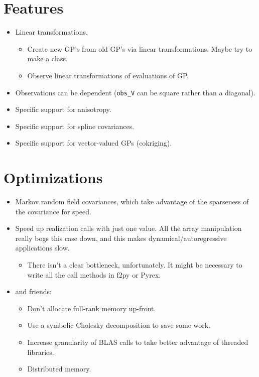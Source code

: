 \documentclass{manual}
\begin{document}
\section{Features}
\begin{itemize}
    \item Linear transformations.
    \begin{itemize}
        \item Create new GP's from old GP's via linear transformations. Maybe try to make a  class.
        \item Observe linear transformations of evaluations of GP.
    \end{itemize}
    \item Observations can be dependent (\texttt{obs_V} can be square rather than a diagonal).
    \item Specific support for anisotropy.
    \item Specific support for spline covariances.
    \item Specific support for vector-valued GPs (cokriging).
\end{itemize}

\section{Optimizations}
\begin{itemize}
    \item Markov random field covariances, which take advantage of the sparseness of the covariance for speed.
    \item Speed up realization calls with just one value. All the array manipulation really bogs this case down, and this makes dynamical/autoregressive applications slow.
    \begin{itemize}
        \item There isn't a clear bottleneck, unfortunately. It might be necessary to write all the call methods in f2py or Pyrex.
    \end{itemize}
\item {} and friends:
\begin{itemize}
    \item Don't allocate full-rank memory up-front.
    \item Use a symbolic Cholesky decomposition to save some work.
    \item Increase granularity of BLAS calls to take better advantage of threaded libraries.
    \item Distributed memory.
\end{itemize}
\end{itemize}
\end{document}

